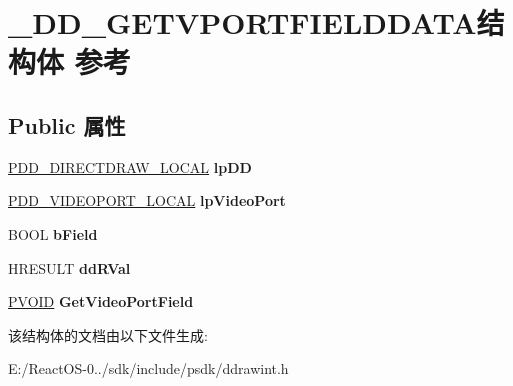 \hypertarget{struct___d_d___g_e_t_v_p_o_r_t_f_i_e_l_d_d_a_t_a}{}\section{\+\_\+\+D\+D\+\_\+\+G\+E\+T\+V\+P\+O\+R\+T\+F\+I\+E\+L\+D\+D\+A\+T\+A结构体 参考}
\label{struct___d_d___g_e_t_v_p_o_r_t_f_i_e_l_d_d_a_t_a}
\subsection*{Public 属性}
\begin{DoxyCompactItemize}
\item 
\mbox{\label{struct___d_d___g_e_t_v_p_o_r_t_f_i_e_l_d_d_a_t_a_ac01091bdd8e81968b7bbe42ec881a161}} 
\hyperlink{struct___d_d___d_i_r_e_c_t_d_r_a_w___l_o_c_a_l}{P\+D\+D\+\_\+\+D\+I\+R\+E\+C\+T\+D\+R\+A\+W\+\_\+\+L\+O\+C\+AL} {\bfseries lp\+DD}
\item 
\mbox{\label{struct___d_d___g_e_t_v_p_o_r_t_f_i_e_l_d_d_a_t_a_a8bea5729835735ba083f60812d3f0fcc}} 
\hyperlink{struct___d_d___v_i_d_e_o_p_o_r_t___l_o_c_a_l}{P\+D\+D\+\_\+\+V\+I\+D\+E\+O\+P\+O\+R\+T\+\_\+\+L\+O\+C\+AL} {\bfseries lp\+Video\+Port}
\item 
\mbox{\label{struct___d_d___g_e_t_v_p_o_r_t_f_i_e_l_d_d_a_t_a_af5d2643c270a55a31cde41036e2c18ab}} 
B\+O\+OL {\bfseries b\+Field}
\item 
\mbox{\label{struct___d_d___g_e_t_v_p_o_r_t_f_i_e_l_d_d_a_t_a_a40d77ac147d6173be2c1688baf97f404}} 
H\+R\+E\+S\+U\+LT {\bfseries dd\+R\+Val}
\item 
\mbox{\label{struct___d_d___g_e_t_v_p_o_r_t_f_i_e_l_d_d_a_t_a_a2dadc1a31f3a50e59c35e14425519861}} 
\hyperlink{interfacevoid}{P\+V\+O\+ID} {\bfseries Get\+Video\+Port\+Field}
\end{DoxyCompactItemize}


该结构体的文档由以下文件生成\+:\begin{DoxyCompactItemize}
\item 
E\+:/\+React\+O\+S-\/0../sdk/include/psdk/ddrawint.\+h\end{DoxyCompactItemize}
